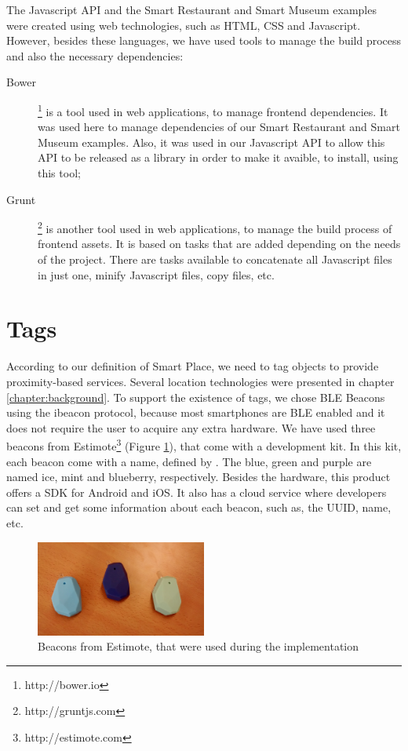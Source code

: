 The Javascript \gls{API} and the Smart Restaurant and Smart Museum examples were created using web technologies, such as \gls{HTML}, \gls{CSS} and Javascript.
However, besides these languages, we have used tools to manage the build process and also the necessary dependencies:
\begin{description}
  \item[Bower]\footnote{http://bower.io} is a tool used in web applications, to manage frontend dependencies. It was used here to manage dependencies of our Smart Restaurant and Smart Museum examples.
  Also, it was used in our Javascript \gls{API} to allow this \gls{API} to be released as a library in order to make it avaible, to install, using this tool;
  \item[Grunt]\footnote{http://gruntjs.com} is another tool used in web applications, to manage the build process of frontend assets.
  It is based on tasks that are added depending on the needs of the project.
  There are tasks available to concatenate all Javascript files in just one, minify Javascript files, copy files, etc.
\end{description}

\section{Tags}
\label{sec:implementation_tags}
According to our definition of Smart Place, we need to tag objects to provide proximity-based services.
Several location technologies were presented in chapter \ref{chapter:background}.
To support the existence of tags, we chose \gls{BLE} Beacons using the ibeacon protocol, because most smartphones are \gls{BLE} enabled and it does not require the user to acquire any extra hardware.
We have used three beacons from Estimote\footnote{http://estimote.com}
(Figure \ref{fig:estimote}), that come with a development kit.
In this kit, each beacon come with a name, defined by .
The blue, green and purple are named ice, mint and blueberry, respectively.
Besides the hardware, this product offers a \gls{SDK} for Android and
iOS. It also has a cloud service where developers can set and get
some information about each beacon, such as, the \gls{UUID}, name, etc.

\begin{figure}[!ht]
  \centering
    \includegraphics[width=0.5\textwidth, keepaspectratio]{images/estimote}
    \caption[Estimote beacons]{Beacons from Estimote, that were used during the implementation}
    \label{fig:estimote}
\end{figure}

